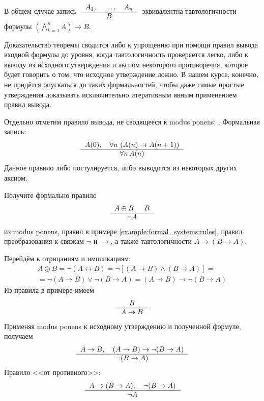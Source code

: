 \begin{remark}
    В общем случае запись $ \; \displaystyle \typerule{A_1, \quad \ldots, \quad A_n}{B} \; $
    эквивалентна тавтологичности формулы $ \left( \bigwedge_{k=1}^n A \right) \rightarrow B $.
\end{remark}

Доказательство теоремы сводится либо к упрощению при помощи правил вывода входной формулы до уровня, когда тавтологичность проверяется легко,
либо к выводу из исходного утверждения и аксиом некоторого противоречия, которое будет говорить о том, что исходное утверждение ложно.
В нашем курсе, конечно, не придётся опускаться до таких формальностей, чтобы даже самые простые утверждения доказывать исключительно итеративным явным применением правил вывода.

Отдельно отметим правило вывода, не сводящееся к modus ponens: .
Формальная запись:
\[
    \typerule{A(0), \quad \forall n \, \left( A(n) \rightarrow A(n+1) \right)}{\forall n \, A(n)}
\]
Данное правило либо постулируется, либо выводится из некоторых других аксиом.

\begin{Exercise}[counter=SecExercise]
    \noindent
    Получите формально правило
    \[
        \typerule{A \oplus B, \quad B}{\neg A}
    \]
    из modus ponens, правил в примере \ref{example:formal_systems:rules}, правил преобразования к связкам $ \neg $ и $ \rightarrow $, а также тавтологичности $ A \rightarrow (B \rightarrow A) $.
\end{Exercise}

\begin{Answer}
    \noindent
    Перейдём к отрицаниям и импликациям:
    \begin{multline*}
        A \oplus B = \neg(A \leftrightarrow B) = \neg \left[ (A \rightarrow B) \wedge (B \rightarrow A) \right] = \\
        =\neg (A \rightarrow B) \vee \neg (B \rightarrow A) = (A \rightarrow B) \rightarrow \neg (B \rightarrow A)
    \end{multline*}
    Из правила в примере имеем
    \[
        \typerule{B}{A \rightarrow B}
    \]
    Применяя modus ponens к исходному утверждению и полученной формуле, получаем
    \[
        \typerule{A \rightarrow B, \quad (A \rightarrow B) \rightarrow \neg (B \rightarrow A)}{\neg (B \rightarrow A)}
    \]
    Правило <<от противного>>:
    \[
        \typerule{A \rightarrow (B \rightarrow A), \quad \neg (B \rightarrow A)}{\neg A}
    \]
\end{Answer}

